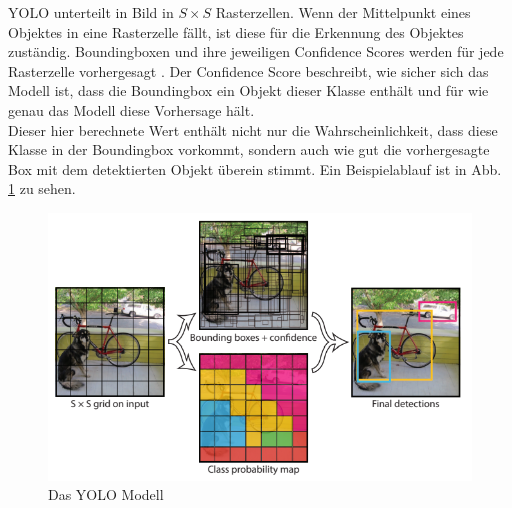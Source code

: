 {{	YOLO unterteilt in Bild in $S \times S $ Rasterzellen. Wenn der Mittelpunkt eines Objektes in eine Rasterzelle fällt, ist diese für die Erkennung des Objektes zuständig. Boundingboxen und ihre jeweiligen Confidence Scores werden für jede Rasterzelle vorhergesagt \citep{Redmon2016}.
	Der Confidence Score beschreibt, wie sicher sich das Modell ist, dass die Boundingbox ein Objekt dieser Klasse enthält und für wie genau das Modell diese Vorhersage hält. \\
	Dieser hier berechnete Wert enthält nicht nur die Wahrscheinlichkeit, dass diese Klasse in der Boundingbox vorkommt, sondern auch wie gut die vorhergesagte Box mit dem detektierten Objekt überein stimmt. Ein Beispielablauf ist in Abb. \ref{YOLO_Model} zu sehen.
	\begin{figure}[ht]
		\centering
		\includegraphics*[scale = 2, keepaspectratio, trim=2 2 2 2 ]{images/YOLO/YOLO_model.png}
		\caption[Das YOLO Modell]{Das YOLO Modell\citep{Redmon2016}}
		\label{YOLO_Model}
 	\end{figure}

	


}}
